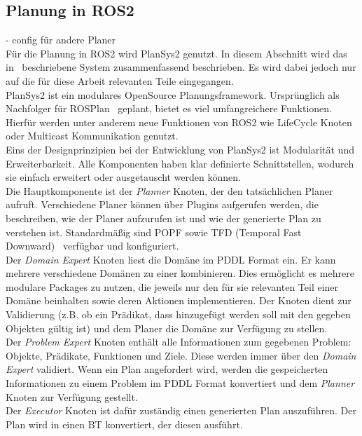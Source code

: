 \subsection{Planung in \ac{ROS2}}
- config für andere Planer\\
Für die Planung in \ac{ROS2} wird \ac{PlanSys2} genutzt.
In diesem Abschnitt wird das in~\cite{plansys} beschriebene System zusammenfassend beschrieben.
Es wird dabei jedoch nur auf die für diese Arbeit relevanten Teile eingegangen.\\
\ac{PlanSys2} ist ein modulares OpenSource Planungsframework.
Ursprünglich als Nachfolger für ROSPlan~\cite{rosplan} geplant, bietet es viel umfangreichere Funktionen.
Hierfür werden unter anderem neue Funktionen von \ac{ROS2} wie LifeCycle Knoten oder Multicast Kommunikation genutzt.\\
Eins der Designprinzipien bei der Entwicklung von \ac{PlanSys2} ist Modularität und Erweiterbarkeit.
Alle Komponenten haben klar definierte Schnittstellen, wodurch sie einfach erweitert oder ausgetauscht werden können.\\
Die Hauptkomponente ist der \emph{Planner} Knoten, der den tatsächlichen Planer aufruft.
Verschiedene Planer können über Plugins aufgerufen werden, die beschreiben, wie der Planer aufzurufen ist und wie der generierte Plan zu verstehen ist.
Standardmäßig sind \ac{POPF} sowie TFD (Temporal Fast Downward)~\cite{tfd} verfügbar und konfiguriert.\\
Der \emph{Domain Expert} Knoten liest die Domäne im \ac{PDDL} Format ein.
Er kann mehrere verschiedene Domänen zu einer kombinieren.
Dies ermöglicht es mehrere modulare Packages zu nutzen, die jeweils nur den für sie relevanten Teil einer Domäne beinhalten sowie deren Aktionen  implementieren.
Der Knoten dient zur Validierung (z.B. ob ein Prädikat, dass hinzugefügt werden soll mit den gegeben Objekten gültig ist) und dem Planer die Domäne zur Verfügung zu stellen.\\
Der \emph{Problem Expert} Knoten enthält alle Informationen zum gegebenen Problem: Objekte, Prädikate, Funktionen und Ziele.
Diese werden immer über den \emph{Domain Expert} validiert.
Wenn ein Plan angefordert wird, werden die gespeicherten Informationen zu einem Problem im \ac{PDDL} Format konvertiert und dem \emph{Planner} Knoten zur Verfügung gestellt.\\
Der \emph{Executor} Knoten ist dafür zuständig einen generierten Plan auszuführen.
Der Plan wird in einen \ac{BT} konvertiert, der diesen ausführt.\\
